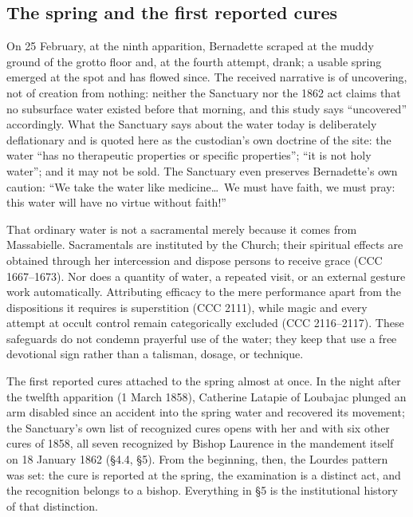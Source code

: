 \subsection{The spring and the first reported cures}

On 25 February, at the ninth apparition, Bernadette scraped at the
muddy ground of the grotto floor and, at the fourth attempt, drank;
a usable spring emerged at the spot and has flowed since. The
received narrative is of uncovering, not of creation from nothing:
neither the Sanctuary nor the 1862 act claims that no subsurface
water existed before that morning, and this study says
``uncovered'' accordingly. What the Sanctuary says about the water
today is deliberately deflationary and is quoted here as the
custodian's own doctrine of the site: the water ``has no
therapeutic properties or specific properties''; ``it is not holy
water''; and it may not be sold. The Sanctuary even preserves
Bernadette's own caution: ``We take the water like medicine\ldots\
We must have faith, we must pray: this water will have no virtue
without faith!''

That ordinary water is not a sacramental merely because it comes
from Massabielle. Sacramentals are instituted by the Church; their
spiritual effects are obtained through her intercession and dispose
persons to receive grace (CCC 1667--1673). Nor does a quantity of
water, a repeated visit, or an external gesture work automatically.
Attributing efficacy to the mere performance apart from the
dispositions it requires is superstition (CCC 2111), while magic
and every attempt at occult control remain categorically excluded
(CCC 2116--2117). These safeguards do not condemn prayerful use of
the water; they keep that use a free devotional sign rather than a
talisman, dosage, or technique.

The first reported cures attached to the spring almost at once. In
the night after the twelfth apparition (1 March 1858), Catherine
Latapie of Loubajac plunged an arm disabled since an accident into
the spring water and recovered its movement; the Sanctuary's own
list of recognized cures opens with her and with six other cures
of 1858, all seven recognized by Bishop Laurence in the mandement
itself on 18 January 1862 (\S4.4, \S5). From the beginning, then, the
Lourdes pattern was set: the cure is reported at the spring, the
examination is a distinct act, and the recognition belongs to a
bishop. Everything in \S5 is the institutional history of that
distinction.
